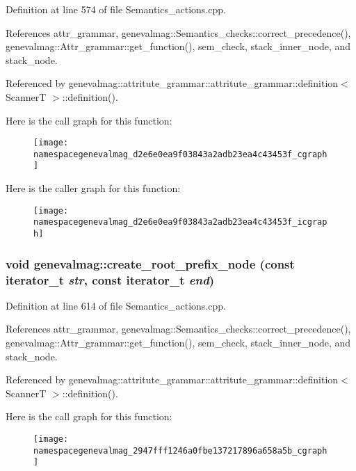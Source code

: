 Definition at line 574 of file Semantics\_\-actions.cpp.

References attr\_\-grammar, genevalmag::Semantics\_\-checks::correct\_\-precedence(), genevalmag::Attr\_\-grammar::get\_\-function(), sem\_\-check, stack\_\-inner\_\-node, and stack\_\-node.

Referenced by genevalmag::attritute\_\-grammar::attritute\_\-grammar::definition$<$ ScannerT $>$::definition().

Here is the call graph for this function:\nopagebreak
\begin{figure}[H]
\begin{center}
\leavevmode
\texttt{[image: namespacegenevalmag\_d2e6e0ea9f03843a2adb23ea4c43453f\_cgraph]}
\end{center}
\end{figure}


Here is the caller graph for this function:\nopagebreak
\begin{figure}[H]
\begin{center}
\leavevmode
\texttt{[image: namespacegenevalmag\_d2e6e0ea9f03843a2adb23ea4c43453f\_icgraph]}
\end{center}
\end{figure}
\hypertarget{namespacegenevalmag_2947fff1246a0fbe137217896a658a5b}{
\subsubsection[{create\_\-root\_\-prefix\_\-node}]{\setlength{\rightskip}{0pt plus 5cm}void genevalmag::create\_\-root\_\-prefix\_\-node (const iterator\_\-t {\em str}, \/  const iterator\_\-t {\em end})}}
\label{namespacegenevalmag_2947fff1246a0fbe137217896a658a5b}




Definition at line 614 of file Semantics\_\-actions.cpp.

References attr\_\-grammar, genevalmag::Semantics\_\-checks::correct\_\-precedence(), genevalmag::Attr\_\-grammar::get\_\-function(), sem\_\-check, stack\_\-inner\_\-node, and stack\_\-node.

Referenced by genevalmag::attritute\_\-grammar::attritute\_\-grammar::definition$<$ ScannerT $>$::definition().

Here is the call graph for this function:\nopagebreak
\begin{figure}[H]
\begin{center}
\leavevmode
\texttt{[image: namespacegenevalmag\_2947fff1246a0fbe137217896a658a5b\_cgraph]}
\end{center}
\end{figure}



